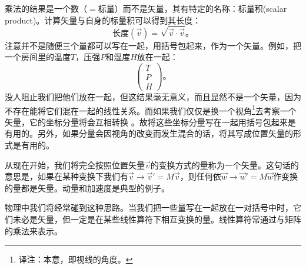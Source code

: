 乘法的结果是一个数（$=$标量）而不是矢量，其有特定的名称：{标量积(scalar product)}。计算矢量与自身的标量积可以得到其长度：
\begin{equation}
\text{长度}(\vec{v}) = \sqrt{\vec{v}\cdot\vec{v}}\text{。}
\end{equation}
注意并不是随便三个量都可以写在一起，用括号包起来，作为一个矢量。例如，把一个房间里的温度$T$，压强$P$和湿度$H$放在一起：
\begin{equation}
\begin{pmatrix}
T \\ P \\ H
\end{pmatrix}\text{。}
\end{equation}
没人阻止我们把他们放在一起，但这结果毫无意义，而且显然不是一个矢量，因为不存在能将它们混在一起的线性关系。而如果我们仅仅是换一个视角\footnote{译注：本意，即视线的角度。}去考察一个矢量，它的坐标分量将会互相转换%
%
。故将这些坐标分量写在一起用括号包起来是有用的。另外，如果分量会因视角的改变而发生混合的话，将其写成位置矢量的形式是有用的。

从现在开始，我们将完全按照位置矢量$\vec{v}$的变换方式的量称为一个矢量。这句话的意思是，如果在某种变换下我们有$\vec{v}\rightarrow\vec{v}'=M\vec{v}$，则任何依$\vec{w}\rightarrow\vec{w}'=M\vec{w}$作变换的量都是矢量。动量和加速度是典型的例子。

物理中我们将经常碰到这种思路。当我们把一些量写在一起放在一对括号中时，它们未必是矢量，但一定是在某些线性算符下相互变换的量。线性算符常通过与矩阵的乘法来表示。

